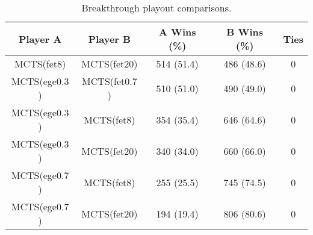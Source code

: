 \documentclass{article}
\begin{document}
\begin{table}[h!]
\begin{center}
\begin{tabular}{|c|c|ccc|}
\hline
Player A & Player B                  & A Wins (\%)  & B Wins (\%)  & Ties \\ 
\hline
MCTS(fet$8$)   & MCTS(fet$20$)       & 514 (51.4)   & 486 (48.6)   & 0    \\
MCTS(ege$0.3$) & MCTS(fet$0.7$)      & 510 (51.0)   & 490 (49.0)   & 0    \\
\hline
MCTS(ege$0.3$) & MCTS(fet$8$)        & 354 (35.4)   & 646 (64.6)   & 0    \\
MCTS(ege$0.3$) & MCTS(fet$20$)       & 340 (34.0)   & 660 (66.0)   & 0    \\
MCTS(ege$0.7$) & MCTS(fet$8$)        & 255 (25.5)   & 745 (74.5)   & 0    \\
MCTS(ege$0.7$) & MCTS(fet$20$)       & 194 (19.4)   & 806 (80.6)   & 0    \\
\hline
\end{tabular}
\end{center}
\caption{Breakthrough playout comparisons.}
\end{table}
\end{document}
